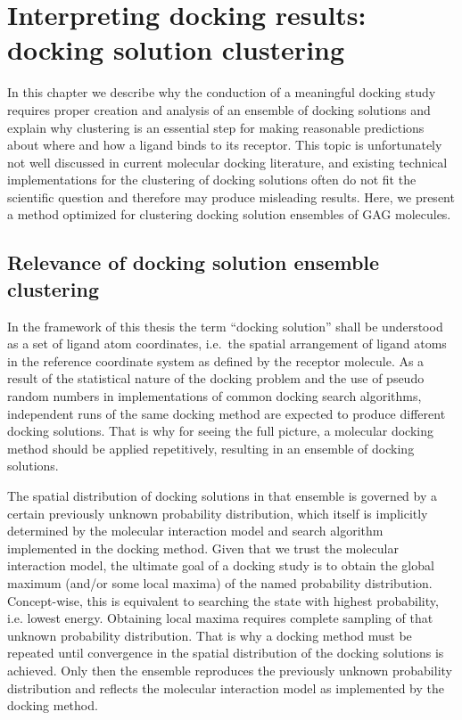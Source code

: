 \chapter{Interpreting docking results: docking solution clustering}

In this chapter we describe why the conduction of a meaningful docking study
requires proper creation and analysis of an ensemble of docking solutions and
explain why clustering is an essential step for making reasonable predictions
about where and how a ligand binds to its receptor. This topic is unfortunately
not well discussed in current molecular docking literature, and existing
technical implementations for the clustering of docking solutions often do not
fit the scientific question and therefore may produce misleading results. Here,
we present a method optimized for clustering docking solution ensembles of GAG
molecules.

\section{Relevance of docking solution ensemble clustering}
\label{relevance_of_clustering}

In the framework of this thesis the term \enquote{docking solution} shall be
understood as a set of ligand atom coordinates, i.e.\ the spatial arrangement of
ligand atoms in the reference coordinate system as defined by the receptor
molecule. As a result of the statistical nature of the docking problem and the
use of pseudo random numbers in implementations of common docking search
algorithms, independent runs of the same docking method are expected to produce
different docking solutions. That is why for seeing the full picture, a
molecular docking method should be applied repetitively, resulting in an
ensemble of docking solutions.

The spatial distribution of docking solutions in that ensemble is governed by a
certain previously unknown probability distribution, which itself is implicitly
determined by the molecular interaction model and search algorithm implemented
in the docking method. Given that we trust the molecular interaction model, the
ultimate goal of a docking study is to obtain the global maximum (and/or some
local maxima) of the named probability distribution. Concept-wise, this is
equivalent to searching the state with highest probability, i.e. lowest energy.
Obtaining local maxima requires complete sampling of that unknown probability
distribution. That is why a docking method must be repeated until convergence
in the spatial distribution of the docking solutions is achieved. Only then the
ensemble reproduces the previously unknown probability distribution and reflects
the molecular interaction model as implemented by the docking method.

